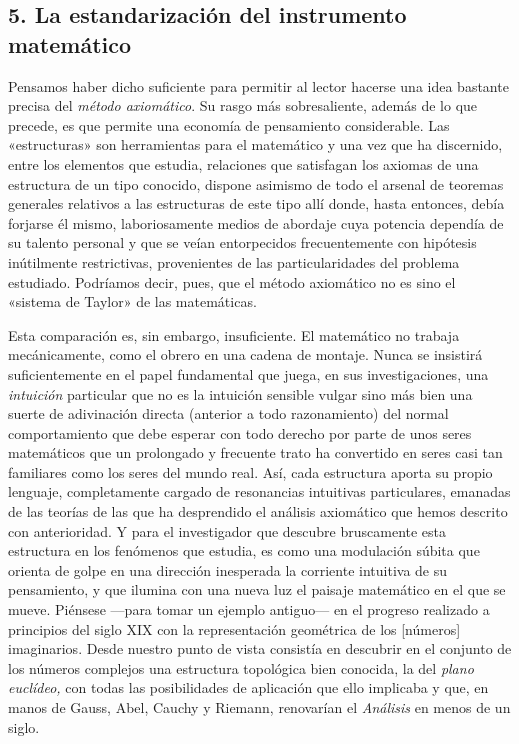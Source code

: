 \documentclass[a4paper, 12pt, draft]{article}
\begin{document}
\subsection*{5. La estandarización del instrumento matemático}

Pensamos haber dicho suficiente para permitir al lector hacerse una idea bastante precisa del \textit{método axiomático}. Su rasgo más sobresaliente, además de lo que precede, es que permite una economía de pensamiento considerable. Las «estructuras» son herramientas para el matemático y una vez que ha discernido, entre los elementos que estudia, relaciones que satisfagan los axiomas de una estructura de un tipo conocido, dispone asimismo de todo el arsenal de teoremas generales relativos a las estructuras de este tipo allí donde, hasta entonces, debía forjarse él mismo, laboriosamente medios de abordaje cuya potencia dependía de su talento personal y que se veían entorpecidos frecuentemente con hipótesis inútilmente restrictivas, provenientes de las particularidades del problema estudiado. Podríamos decir, pues, que el método axiomático no es sino el «sistema de Taylor» de las matemáticas. 

Esta comparación es, sin embargo, insuficiente. El matemático no trabaja mecánicamente, como el obrero en una cadena de montaje. Nunca se insistirá suficientemente en el papel fundamental que juega, en sus investigaciones, una \textit{intuición} particular que no es la intuición sensible vulgar sino más bien una suerte de adivinación directa (anterior a todo razonamiento) del normal comportamiento que debe esperar con todo derecho por parte de unos seres matemáticos que un prolongado y frecuente trato ha convertido en seres casi tan familiares como los seres del mundo real. Así, cada estructura aporta su propio lenguaje, completamente cargado de resonancias intuitivas particulares, emanadas de las teorías de las que ha desprendido el análisis axiomático que hemos descrito con anterioridad. Y para el investigador que descubre bruscamente esta estructura en los fenómenos que estudia, es como una modulación súbita que orienta de golpe en una dirección inesperada la corriente intuitiva de su pensamiento, y que ilumina con una nueva luz el paisaje matemático en el que se mueve. Piénsese ---para tomar un ejemplo antiguo--- en el progreso realizado a principios del siglo XIX con la representación geométrica de los [números] imaginarios. Desde nuestro punto de vista consistía en descubrir en el conjunto de los números complejos una estructura topológica bien conocida, la del \textit{plano euclídeo,} con todas las posibilidades de aplicación que ello implicaba y que, en manos de Gauss, Abel, Cauchy y Riemann, renovarían el \textit{Análisis} en menos de un siglo. 
\end{document}
